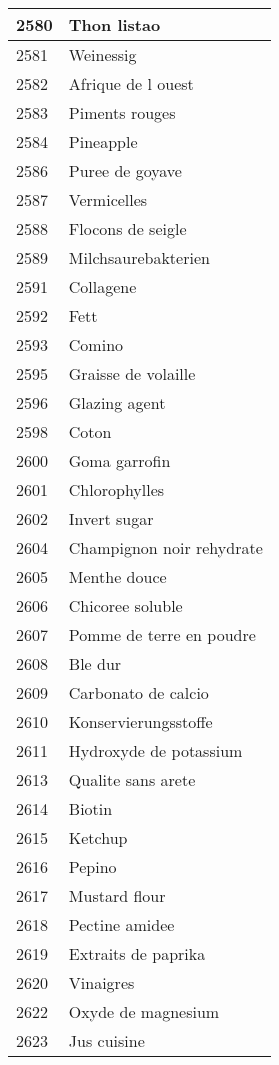 \begin{longtable}{|l|l|}
2580 & Thon listao \\ \hline 
2581 & Weinessig \\ \hline 
2582 & Afrique de l ouest \\ \hline 
2583 & Piments rouges \\ \hline 
2584 & Pineapple \\ \hline 
2586 & Puree de goyave \\ \hline 
2587 & Vermicelles \\ \hline 
2588 & Flocons de seigle \\ \hline 
2589 & Milchsaurebakterien \\ \hline 
2591 & Collagene \\ \hline 
2592 & Fett \\ \hline 
2593 & Comino \\ \hline 
2595 & Graisse de volaille \\ \hline 
2596 & Glazing agent \\ \hline 
2598 & Coton \\ \hline 
2600 & Goma garrofin \\ \hline 
2601 & Chlorophylles \\ \hline 
2602 & Invert sugar \\ \hline 
2604 & Champignon noir rehydrate \\ \hline 
2605 & Menthe douce \\ \hline 
2606 & Chicoree soluble \\ \hline 
2607 & Pomme de terre en poudre \\ \hline 
2608 & Ble dur \\ \hline 
2609 & Carbonato de calcio \\ \hline 
2610 & Konservierungsstoffe \\ \hline 
2611 & Hydroxyde de potassium \\ \hline 
2613 & Qualite sans arete \\ \hline 
2614 & Biotin \\ \hline 
2615 & Ketchup \\ \hline 
2616 & Pepino \\ \hline 
2617 & Mustard flour \\ \hline 
2618 & Pectine amidee \\ \hline 
2619 & Extraits de paprika \\ \hline 
2620 & Vinaigres \\ \hline 
2622 & Oxyde de magnesium \\ \hline 
2623 & Jus cuisine \\ \hline 

\end{longtable}
